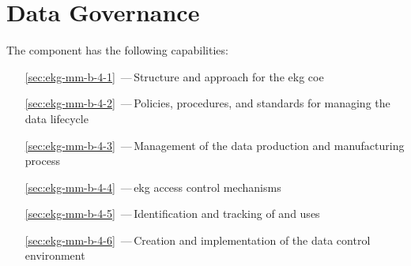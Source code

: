 \chapter{Data Governance}\label{ch:ekg-mm-b-4} %

The  component has the following capabilities:

\begin{itemize}[leftmargin=.5in]
  \item [\ref{sec:ekg-mm-b-4-1}] \,---\,Structure and approach for the \gls{ekg} \gls{coe}
  \item [\ref{sec:ekg-mm-b-4-2}] \,---\,Policies, procedures, and standards for managing the data lifecycle
  \item [\ref{sec:ekg-mm-b-4-3}] \,---\,Management of the data production and manufacturing process
  \item [\ref{sec:ekg-mm-b-4-4}] \,---\,\gls{ekg} access control mechanisms
  \item [\ref{sec:ekg-mm-b-4-5}] \,---\,Identification and tracking of  and uses
  \item [\ref{sec:ekg-mm-b-4-6}] \,---\,Creation and implementation of the data control environment
\end{itemize}








